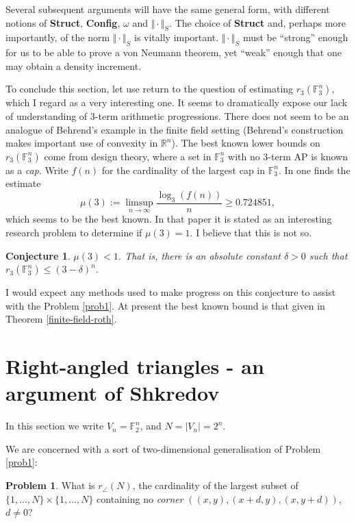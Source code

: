 \documentclass[12pt,a4paper,reqno]{amsart}
\numberwithin{equation}{section}
\theoremstyle{plain}
\newtheorem{conjecture}[subsection]{Conjecture}
\theoremstyle{definition}
\newtheorem{problem}[subsection]{Problem}
\renewcommand{\leq}{\leqslant}
\renewcommand{\geq}{\geqslant}
\begin{document}
\noindent Several subsequent arguments will have the same general form, with different notions of \textbf{Struct}, \textbf{Config}, $\omega$ and $\Vert \cdot \Vert_S$. The choice of \textbf{Struct} and, perhaps more importantly, of the norm $\Vert \cdot \Vert_S$ is vitally important. $\Vert \cdot \Vert_S$ must be ``strong'' enough for us to be able to prove a von Neumann theorem, yet ``weak'' enough that one may obtain a density increment.\vspace{11pt}

\noindent To conclude this section, let use return to the question of estimating $r_3(\mathbb{F}_3^n)$, which I regard as a very interesting one. It seems to dramatically expose our lack of understanding of 3-term arithmetic progressions. There does not seem to be an analogue of Behrend's example in the finite field setting (Behrend's construction makes important use of convexity in $\mathbb{R}^n$). The best known lower bounds on $r_3(\mathbb{F}_3^n)$ come from design theory, where a set in $\mathbb{F}_3^n$ with no 3-term AP is known as a \textit{cap}. Write $f(n)$ for the cardinality of the largest cap in $\mathbb{F}_3^n$. In \cite{edel} one finds the estimate
\[ \mu(3) := \limsup_{n \rightarrow \infty} \frac{\log_3(f(n))}{n} \geq 0.724851,\] which seems to be the best known.
In that paper it is stated as an interesting research problem to determine if $\mu(3) = 1$. I believe that this is not so.

\begin{conjecture}
$\mu(3) < 1$. That is, there is an absolute constant $\delta > 0$ such that $r_3(\mathbb{F}_3^n) \leq (3 - \delta)^n$.
\end{conjecture}

\noindent I would expect any methods used to make progress on this conjecture to assist with the Problem \ref{prob1}. At present the best known bound is that given in Theorem \ref{finite-field-roth}.

\section{Right-angled triangles - an argument of Shkredov}\label{sec5}
\noindent In this section we write $V_n = \mathbb{F}_2^n$, and $N = |V_n| = 2^n$.

\noindent We are concerned with a sort of two-dimensional generalisation of Problem \ref{prob1}:

\begin{problem} What is $r_{\angle}(N)$, the cardinality of the largest subset of $\{1,\dots,N\} \times \{1,\dots,N\}$ containing no \emph{corner} $((x,y), (x + d,y), (x, y+d))$, $d \neq 0$?\end{problem}
\end{document}
